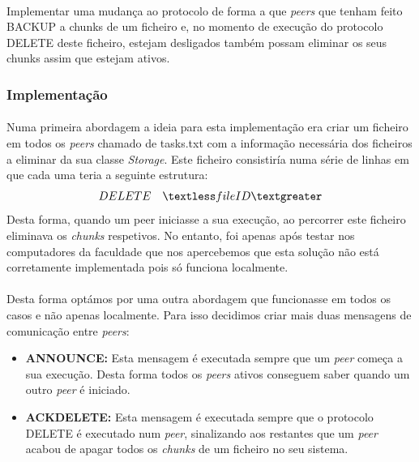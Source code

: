 \documentclass[11pt,oneside]{book}
\begin{document}
\paragraph{}
Implementar uma mudança ao protocolo de forma a que \textit{peers} que tenham
feito BACKUP a chunks de um ficheiro e, no momento de execução do protocolo 
DELETE deste ficheiro, estejam desligados também possam eliminar os seus chunks 
assim que estejam ativos.

\subsubsection{Implementação}
\paragraph{}
    Numa primeira abordagem a ideia para esta implementação era criar um ficheiro
    em todos os \textit{peers} chamado de tasks.txt com a informação necessária
    dos ficheiros a eliminar da sua classe \textit{Storage}. Este ficheiro consistiría
    numa série de linhas em que cada uma teria a seguinte estrutura:
    \begin{equation}
        DELETE \quad \textless fileID\textgreater
    \end{equation}
    Desta forma, quando um peer iniciasse a sua execução, ao percorrer este ficheiro eliminava os 
    \textit{chunks} respetivos. No entanto, foi apenas após testar nos computadores da 
    faculdade que nos apercebemos que esta solução não está corretamente implementada pois só funciona 
    localmente.


\paragraph{}
    Desta forma optámos por uma outra abordagem que funcionasse em todos os casos
    e não apenas localmente. Para isso decidimos criar mais duas mensagens de comunicação 
    entre \textit{peers}:
    \begin{itemize}
        \item \textbf{ANNOUNCE:} Esta mensagem é executada sempre que um 
        \textit{peer} começa a sua execução. Desta forma todos os \textit{peers} ativos 
        conseguem saber quando um outro \textit{peer} é iniciado.
        \item \textbf{ACKDELETE:} Esta mensagem é executada sempre que o protocolo DELETE
        é executado num \textit{peer}, sinalizando aos restantes que um \textit{peer} acabou 
        de apagar todos os \textit{chunks} de um ficheiro no seu sistema.
    \end{itemize}
\end{document}
